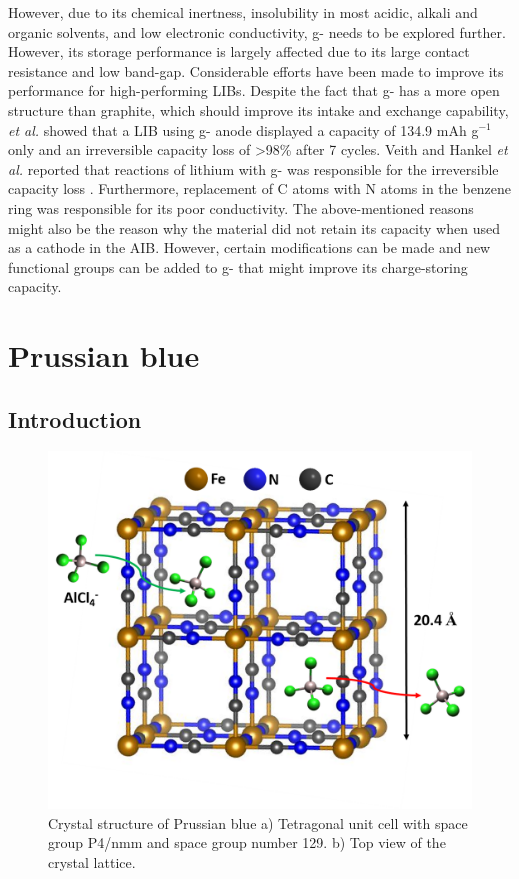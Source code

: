 However, due to its chemical inertness, insolubility in most acidic, alkali and organic solvents, and low electronic conductivity, g- needs to be explored further. However, its storage performance is largely affected due to its large contact resistance and low band-gap. Considerable efforts have been made to improve its performance for high-performing LIBs. Despite the fact that g- has a more open structure than graphite, which should improve its  intake and exchange capability, \cite{luo_gra} \textit{et al.} showed that a LIB using g- anode displayed a capacity of 134.9 mAh g$^{-1}$ only and an irreversible capacity loss of >98\% after 7 cycles. Veith and Hankel \textit{et al.} reported that reactions of lithium with g- was responsible for the irreversible capacity loss \cite{veith_electrochemical_2013, hankel}. Furthermore, replacement of C atoms with N atoms in the benzene ring was responsible for its poor conductivity. The above-mentioned reasons might also be the reason why the material did not retain its capacity when used as a cathode in the AIB. However, certain modifications can be made and new functional groups can be added to g- that might improve its charge-storing capacity.

\section{Prussian blue}

\subsection{Introduction}

 \begin{figure}[tbh!]
  \centering
  \includegraphics[width=\textwidth]{Figures/chap6fig/pbcrys}
    \caption{Crystal structure of Prussian blue a) Tetragonal unit cell with space group P4/nmm and space group number 129. b) Top view of the crystal lattice.}
  \label{Figures/chap6fig:pbcrys}
\end{figure}

